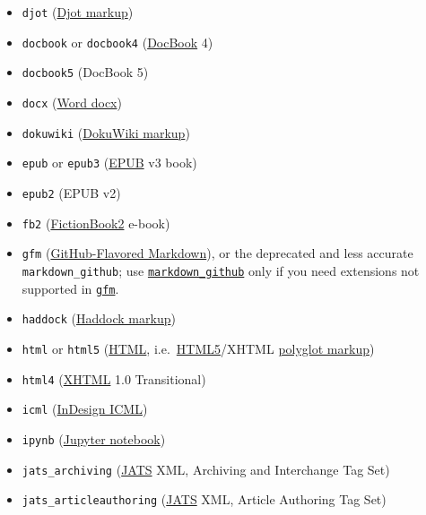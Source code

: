 \documentclass[
]{article}
\begin{document}
\begin{description}
\begin{itemize}
  (\href{https://citeproc-js.readthedocs.io/en/latest/csl-json/markup.html}{CSL
  JSON} bibliography)
\item
  \texttt{djot} (\href{https://djot.net}{Djot markup})
\item
  \texttt{docbook} or \texttt{docbook4}
  (\href{https://docbook.org}{DocBook} 4)
\item
  \texttt{docbook5} (DocBook 5)
\item
  \texttt{docx}
  (\href{https://en.wikipedia.org/wiki/Office_Open_XML}{Word docx})
\item
  \texttt{dokuwiki} (\href{https://www.dokuwiki.org/dokuwiki}{DokuWiki
  markup})
\item
  \texttt{epub} or \texttt{epub3} (\href{http://idpf.org/epub}{EPUB} v3
  book)
\item
  \texttt{epub2} (EPUB v2)
\item
  \texttt{fb2}
  (\href{http://www.fictionbook.org/index.php/Eng:XML_Schema_Fictionbook_2.1}{FictionBook2}
  e-book)
\item
  \texttt{gfm}
  (\href{https://help.github.com/articles/github-flavored-markdown/}{GitHub-Flavored
  Markdown}), or the deprecated and less accurate
  \texttt{markdown\_github}; use
  \protect\hyperlink{markdown-variants}{\texttt{markdown\_github}} only
  if you need extensions not supported in
  \protect\hyperlink{markdown-variants}{\texttt{gfm}}.
\item
  \texttt{haddock}
  (\href{https://www.haskell.org/haddock/doc/html/ch03s08.html}{Haddock
  markup})
\item
  \texttt{html} or \texttt{html5}
  (\href{https://www.w3.org/html/}{HTML},
  i.e.~\href{https://html.spec.whatwg.org/}{HTML5}/XHTML
  \href{https://www.w3.org/TR/html-polyglot/}{polyglot markup})
\item
  \texttt{html4} (\href{https://www.w3.org/TR/xhtml1/}{XHTML} 1.0
  Transitional)
\item
  \texttt{icml}
  (\href{https://web.archive.org/web/20211006210211/https://wwwimages.adobe.com/www.adobe.com/content/dam/acom/en/devnet/indesign/sdk/cs6/idml/idml-cookbook.pdf}{InDesign
  ICML})
\item
  \texttt{ipynb}
  (\href{https://nbformat.readthedocs.io/en/latest/}{Jupyter notebook})
\item
  \texttt{jats\_archiving} (\href{https://jats.nlm.nih.gov}{JATS} XML,
  Archiving and Interchange Tag Set)
\item
  \texttt{jats\_articleauthoring} (\href{https://jats.nlm.nih.gov}{JATS}
  XML, Article Authoring Tag Set)

\end{itemize}
\end{description}
\end{document}
